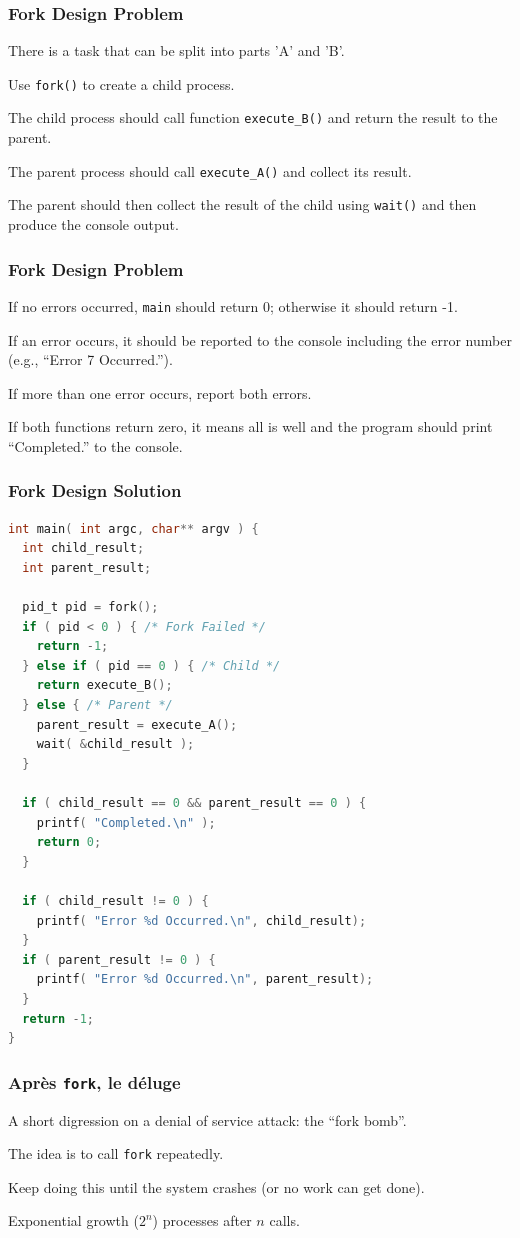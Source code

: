 \begin{frame}
	\frametitle{Fork Design Problem}

	There is a task that can be split into parts 'A' and 'B'.

	Use \texttt{fork()} to create a child process.

	The child process should call function \texttt{execute\_B()} and return the result to the parent.

	The parent process should call \texttt{execute\_A()} and collect its result.

	The parent should then collect the result of the child using \texttt{wait()} and then produce the console output.

\end{frame}

\begin{frame}
	\frametitle{Fork Design Problem}
	If no errors occurred, \texttt{main} should return 0; otherwise it should return -1.

	If an error occurs, it should be reported to the console including the error number (e.g., ``Error 7 Occurred.'').

	If more than one error occurs, report both errors.

	If both functions return zero, it means all is well and the program should print ``Completed.'' to the console.

\end{frame}


\begin{frame}[fragile]
	\frametitle{Fork Design Solution}
	\begin{lstlisting}[language=C]
int main( int argc, char** argv ) {
  int child_result;
  int parent_result;

  pid_t pid = fork();
  if ( pid < 0 ) { /* Fork Failed */
    return -1;
  } else if ( pid == 0 ) { /* Child */
    return execute_B();
  } else { /* Parent */ 
    parent_result = execute_A();
    wait( &child_result );
  }
  
  if ( child_result == 0 && parent_result == 0 ) {
    printf( "Completed.\n" );
    return 0;
  }
  
  if ( child_result != 0 ) {
    printf( "Error %d Occurred.\n", child_result);
  }
  if ( parent_result != 0 ) {
    printf( "Error %d Occurred.\n", parent_result);
  }
  return -1;
}
\end{lstlisting}
\end{frame}

\begin{frame}
	\frametitle{Apr\`{e}s \texttt{fork}, le d\'{e}luge}

	A short digression on a denial of service attack: the ``fork bomb''.

	The idea is to call \texttt{fork} repeatedly.

	Keep doing this until the system crashes (or no work can get done).

	Exponential growth ($2^n$) processes after $n$ calls.

\end{frame}


